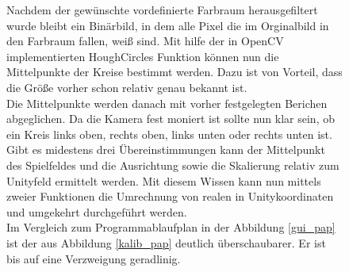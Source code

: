 \begin{figure} [h]
\begin{minipage}[t]{0.5\textwidth}
\vspace{0pt}

Nachdem der gewünschte vordefinierte Farbraum herausgefiltert wurde bleibt ein Binärbild, in dem alle Pixel die im Orginalbild in den Farbraum fallen, weiß sind. Mit hilfe der in OpenCV implementierten HoughCircles Funktion \cite{rhody2005lecture} können nun die Mittelpunkte der Kreise bestimmt werden. Dazu ist von Vorteil, dass die Größe vorher schon relativ genau bekannt ist. \\ 
Die Mittelpunkte werden danach mit vorher festgelegten Berichen abgeglichen. Da die Kamera fest moniert ist sollte nun klar sein, ob ein Kreis links oben, rechts oben, links unten oder rechts unten ist. Gibt es midestens drei Übereinstimmungen kann der Mittelpunkt des Spielfeldes und die Ausrichtung sowie die Skalierung relativ zum Unityfeld ermittelt werden. Mit diesem Wissen kann nun mittels zweier Funktionen die Umrechnung von realen in Unitykoordinaten und umgekehrt durchgeführt werden.\\
 Im Vergleich zum Programmablaufplan in der Abbildung \ref{gui_pap} ist der aus Abbildung \ref{kalib_pap} deutlich überschaubarer. Er ist bis auf eine Verzweigung geradlinig.
\end{minipage}
\hspace{0.1\textwidth}
\begin{minipage}[t]{0.3\textwidth}
\vspace{0pt}

\end{minipage}
\end{figure}
